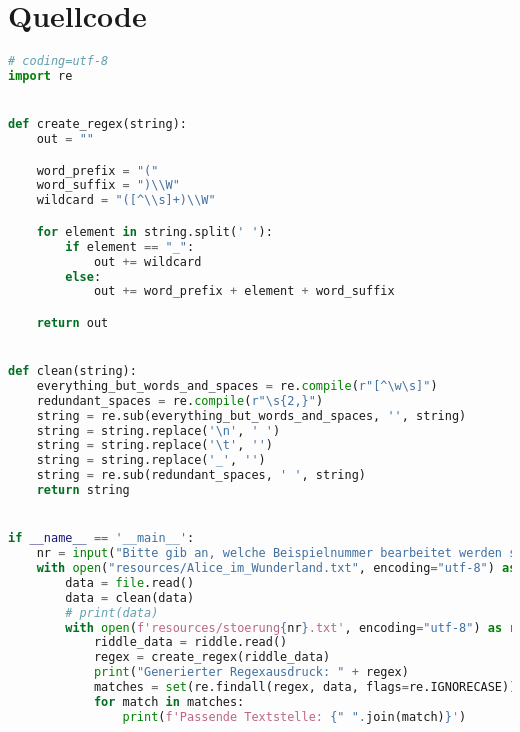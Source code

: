 \section{Quellcode}\label{sec:quellcode}
\begin{lstlisting}[language=Python,label={lst:sourcecode}]
# coding=utf-8
import re


def create_regex(string):
    out = ""

    word_prefix = "("
    word_suffix = ")\\W"
    wildcard = "([^\\s]+)\\W"

    for element in string.split(' '):
        if element == "_":
            out += wildcard
        else:
            out += word_prefix + element + word_suffix

    return out


def clean(string):
    everything_but_words_and_spaces = re.compile(r"[^\w\s]")
    redundant_spaces = re.compile(r"\s{2,}")
    string = re.sub(everything_but_words_and_spaces, '', string)
    string = string.replace('\n', ' ')
    string = string.replace('\t', '')
    string = string.replace('_', '')
    string = re.sub(redundant_spaces, ' ', string)
    return string


if __name__ == '__main__':
    nr = input("Bitte gib an, welche Beispielnummer bearbeitet werden soll: ")
    with open("resources/Alice_im_Wunderland.txt", encoding="utf-8") as file:
        data = file.read()
        data = clean(data)
        # print(data)
        with open(f'resources/stoerung{nr}.txt', encoding="utf-8") as riddle:
            riddle_data = riddle.read()
            regex = create_regex(riddle_data)
            print("Generierter Regexausdruck: " + regex)
            matches = set(re.findall(regex, data, flags=re.IGNORECASE))
            for match in matches:
                print(f'Passende Textstelle: {" ".join(match)}')
\end{lstlisting}

